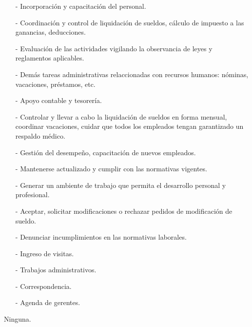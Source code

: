 \documentclass[a4paper,10pt,titlepage]{article}
\begin{document}
{
    \begin{itemize}
        \item[-] Incorporaci\'on y capacitaci\'on del personal.
        \item[-] Coordinaci\'on y control de liquidaci\'on de sueldos, c\'alculo de impuesto a las ganancias, deducciones.
        \item[-] Evaluaci\'on de las actividades vigilando la observancia de leyes y reglamentos aplicables.
        \item[-] Dem\'as tareas administrativas relaccionadas con recursos humanos: n\'ominas, vacaciones, pr\'estamos, etc.
        \item[-] Apoyo contable y tesorer\'ia.
    \end{itemize}
}
{
    \begin{itemize}
         \item[-] Controlar y llevar a cabo la liquidaci\'on de sueldos en forma mensual, coordinar vacaciones, cuidar que todos los empleados tengan garantizado un respaldo m\'edico.
        \item[-] Gesti\'on del desempeño, capacitaci\'on de nuevos empleados.
        \item[-] Mantenerse actualizado y cumplir con las normativas vigentes.
        \item[-] Generar un ambiente de trabajo que permita el desarrollo personal y profesional.
    \end{itemize}
}
{
    \begin{itemize}
        \item[-] Aceptar, solicitar modificaciones o rechazar pedidos de modificaci\'on de sueldo.
        \item[-] Denunciar incumplimientos en las normativas laborales.
    \end{itemize}
}


\newpage

{
    \begin{itemize}
        \item[-] Ingreso de visitas.
        \item[-] Trabajos administrativos.
    \end{itemize}
}
{
    \begin{itemize}
        \item[-] Correspondencia.
        \item[-] Agenda de gerentes.
    \end{itemize}
}
{
  Ninguna.
}
\end{document}
